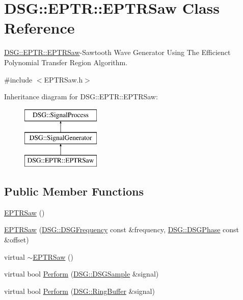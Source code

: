 \hypertarget{class_d_s_g_1_1_e_p_t_r_1_1_e_p_t_r_saw}{\section{D\+S\+G\+:\+:E\+P\+T\+R\+:\+:E\+P\+T\+R\+Saw Class Reference}
\label{class_d_s_g_1_1_e_p_t_r_1_1_e_p_t_r_saw}
}


\hyperlink{class_d_s_g_1_1_e_p_t_r_1_1_e_p_t_r_saw}{D\+S\+G\+::\+E\+P\+T\+R\+::\+E\+P\+T\+R\+Saw}-\/\+Sawtooth Wave Generator Using The Efficienct Polynomial Transfer Region Algorithm.  




{\ttfamily \#include $<$E\+P\+T\+R\+Saw.\+h$>$}

Inheritance diagram for D\+S\+G\+:\+:E\+P\+T\+R\+:\+:E\+P\+T\+R\+Saw\+:\begin{figure}[H]
\begin{center}
\leavevmode
\includegraphics[height=3.000000cm]{class_d_s_g_1_1_e_p_t_r_1_1_e_p_t_r_saw}
\end{center}
\end{figure}
\subsection*{Public Member Functions}
\begin{DoxyCompactItemize}
\item 
\hyperlink{class_d_s_g_1_1_e_p_t_r_1_1_e_p_t_r_saw_a65c2009548fb7f946d48ea794c830501}{E\+P\+T\+R\+Saw} ()
\item 
\hyperlink{class_d_s_g_1_1_e_p_t_r_1_1_e_p_t_r_saw_a3a571a16f3ef0e230db2daa0cd249855}{E\+P\+T\+R\+Saw} (\hyperlink{namespace_d_s_g_a4315a061386fa1014fda09b15d3a6973}{D\+S\+G\+::\+D\+S\+G\+Frequency} const \&frequency, \hyperlink{namespace_d_s_g_a44431ce1eb0a7300efdd207bc879e52c}{D\+S\+G\+::\+D\+S\+G\+Phase} const \&offset)
\item 
virtual \hyperlink{class_d_s_g_1_1_e_p_t_r_1_1_e_p_t_r_saw_a932fb8ef2df61ed06e6cca5cdc622884}{$\sim$\+E\+P\+T\+R\+Saw} ()
\item 
virtual bool \hyperlink{class_d_s_g_1_1_e_p_t_r_1_1_e_p_t_r_saw_aa253efa41cca56f334ccb0fd32c2cd56}{Perform} (\hyperlink{namespace_d_s_g_ac39a94cd27ebcd9c1e7502d0c624894a}{D\+S\+G\+::\+D\+S\+G\+Sample} \&signal)
\item 
virtual bool \hyperlink{class_d_s_g_1_1_e_p_t_r_1_1_e_p_t_r_saw_a9dbefaeeb74e30e722bb5d8ea767cdca}{Perform} (\hyperlink{class_d_s_g_1_1_ring_buffer}{D\+S\+G\+::\+Ring\+Buffer} \&signal)
\end{DoxyCompactItemize}
